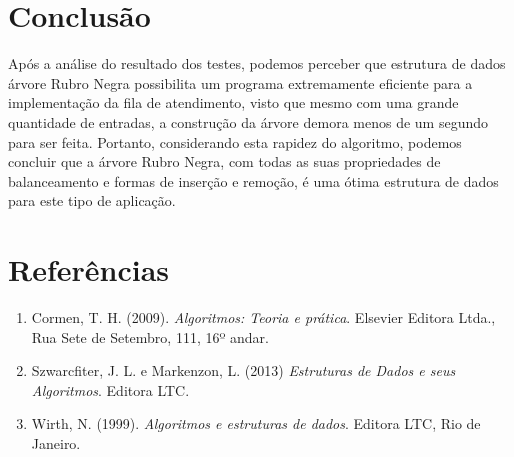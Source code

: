 \documentclass[a4paper,11pt]{article}
\begin{document}
\section{Conclusão}
    Após a análise do resultado dos testes, podemos perceber que estrutura de dados árvore Rubro Negra possibilita um programa extremamente eficiente para a implementação da fila de atendimento, visto que mesmo com uma grande quantidade de entradas, a construção da árvore demora menos de um segundo para ser feita. Portanto, considerando esta rapidez do algoritmo, podemos concluir que a árvore Rubro Negra, com todas as suas propriedades de balanceamento e formas de inserção e remoção, é uma ótima estrutura de dados para este tipo de aplicação.
    
\bigskip
\section{Referências}
    \begin{enumerate}
        \item Cormen, T. H. (2009). \textit{Algoritmos: Teoria e prática}. Elsevier Editora Ltda., Rua Sete de Setembro, 111, 16º andar.
    
        \item Szwarcfiter, J. L. e Markenzon, L. (2013) \textit{Estruturas de Dados e seus Algoritmos}. Editora LTC.
    
        \item Wirth, N. (1999). \textit{Algoritmos e estruturas de dados}. Editora LTC, Rio de Janeiro.
    \end{enumerate}
\end{document}
